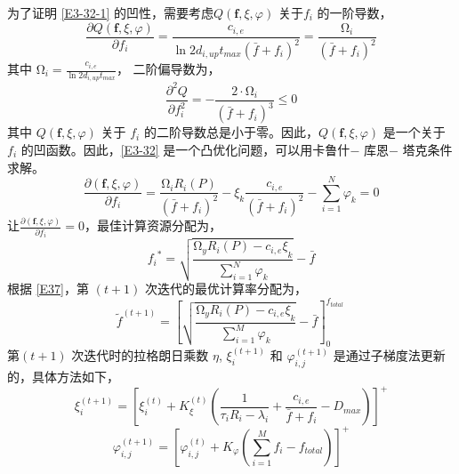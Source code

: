 为了证明 \eqref{E3-32-1} 的凹性，需要考虑$Q\left(\mathbf{f},\xi,\varphi\right)$ 关于$f_i$ 的一阶导数，
\begin{equation}\label{E34}
\!\!\frac{\partial Q\left(\mathbf{f},\xi,\varphi\right)}{\partial f_i}=\frac{c_{i,e}}{\ln{2} d_{i,up}t_{max}\left(\bar{f}+f_i\right)^2}=\frac{\mathrm{\Omega}_i}{\left(\bar{f}+f_i\right)^2}
\end{equation}
其中 $\mathrm{\Omega}_i=\frac{c_{i,e}}{\ln{2}d_{i,up}t_{max}}$， 二阶偏导数为，
\begin{equation}\label{E35}
\frac{\partial^2Q}{\partial f_i^2}=-\frac{2\cdot\mathrm{\Omega}_i}{\left(\bar{f}+f_i\right)^3}\le0
\end{equation}
其中 $Q\left(\mathbf{f},\xi,\varphi\right)$ 关于 $f_i$ 的二阶导数总是小于零。因此，$Q\left(\mathbf{f},\xi,\varphi\right)$ 是一个关于 $f_i$ 的凹函数。因此，\eqref{E3-32} 是一个凸优化问题，可以用卡鲁什$-$ 库恩$-$ 塔克条件求解。
\begin{equation}\label{E36}
\frac{\partial\left(\mathbf{f},\xi,\varphi\right)}{\partial f_i}=\frac{\mathrm{\Omega}_iR_i\left(P\right)}{\left(\bar{f}+f_i\right)^2}-\xi_k\frac{c_{i,e}}{\left(\bar{f}+f_i\right)^2}-\sum_{i=1}^{N}\varphi_k=0
\end{equation}
让$\frac{\partial \left(\mathbf{f},\xi,\varphi\right)}{\partial f_i}=0$，最佳计算资源分配为，
\begin{equation}\label{E37}
{f_i}^\ast=\sqrt{\frac{\mathrm{\Omega}_yR_i\left(P\right)-{c_{i,e}\xi}_k}{\sum_{i=1}^{N}\varphi_k}}-\bar{f}
\end{equation}
根据 \eqref{E37}，第 $(t+1)$ 次迭代的最优计算率分配为，
\begin{equation}\label{E38}
{\tilde{f}}^{\left(t+1\right)}=\left[\sqrt{\frac{\mathrm{\Omega}_yR_i\left(P\right)
-{c_{i,e}\xi}_k}{\sum_{i=1}^{M}\varphi_k}}-\bar{f}\right]_0^{f_{total}\ }
\end{equation}
第$(t+1)$ 次迭代时的拉格朗日乘数 $\eta$, $\xi_i^{\left(t+1\right)}$ 和 $\varphi_{i,j}^{\left(t+1\right)}$ 是通过子梯度法更新的，具体方法如下，
\begin{equation}\label{E39}
\xi_i^{\left(t+1\right)}=\left[\xi_i^{\left(t\right)}\!+\!K_\xi^{\left(t\right)}\!\left(\frac{1}{\tau_iR_i
-\lambda_i}\!+\!\frac{c_{i,e}}{\bar{f}+f_i}\!-\!D_{max}\!\right)\!\right]^+
\end{equation}
\begin{equation}
\varphi_{i,j}^{\left(t+1\right)}=\left[\varphi_{i,j}^{\left(t\right)}+K_\varphi\left(\sum_{i=1}^{M}f_i
-f_{total}\right)\right]^+
\end{equation}
